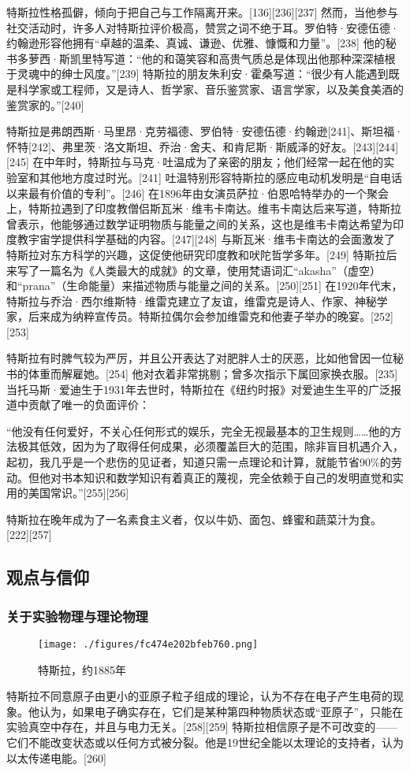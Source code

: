 特斯拉性格孤僻，倾向于把自己与工作隔离开来。[136][236][237] 然而，当他参与社交活动时，许多人对特斯拉评价极高，赞赏之词不绝于耳。罗伯特·安德伍德·约翰逊形容他拥有“卓越的温柔、真诚、谦逊、优雅、慷慨和力量”。[238] 他的秘书多萝西·斯凯里特写道：“他的和蔼笑容和高贵气质总是体现出他那种深深植根于灵魂中的绅士风度。”[239] 特斯拉的朋友朱利安·霍桑写道：“很少有人能遇到既是科学家或工程师，又是诗人、哲学家、音乐鉴赏家、语言学家，以及美食美酒的鉴赏家的。”[240]

特斯拉是弗朗西斯·马里昂·克劳福德、罗伯特·安德伍德·约翰逊[241]、斯坦福·怀特[242]、弗里茨·洛文斯坦、乔治·舍夫、和肯尼斯·斯威泽的好友。[243][244][245] 在中年时，特斯拉与马克·吐温成为了亲密的朋友；他们经常一起在他的实验室和其他地方度过时光。[241] 吐温特别形容特斯拉的感应电动机发明是“自电话以来最有价值的专利”。[246] 在1896年由女演员萨拉·伯恩哈特举办的一个聚会上，特斯拉遇到了印度教僧侣斯瓦米·维韦卡南达。维韦卡南达后来写道，特斯拉曾表示，他能够通过数学证明物质与能量之间的关系，这也是维韦卡南达希望为印度教宇宙学提供科学基础的内容。[247][248] 与斯瓦米·维韦卡南达的会面激发了特斯拉对东方科学的兴趣，这促使他研究印度教和吠陀哲学多年。[249] 特斯拉后来写了一篇名为《人类最大的成就》的文章，使用梵语词汇“akasha”（虚空）和“prana”（生命能量）来描述物质与能量之间的关系。[250][251] 在1920年代末，特斯拉与乔治·西尔维斯特·维雷克建立了友谊，维雷克是诗人、作家、神秘学家，后来成为纳粹宣传员。特斯拉偶尔会参加维雷克和他妻子举办的晚宴。[252][253]

特斯拉有时脾气较为严厉，并且公开表达了对肥胖人士的厌恶，比如他曾因一位秘书的体重而解雇她。[254] 他对衣着非常挑剔；曾多次指示下属回家换衣服。[235] 当托马斯·爱迪生于1931年去世时，特斯拉在《纽约时报》对爱迪生生平的广泛报道中贡献了唯一的负面评价：

“他没有任何爱好，不关心任何形式的娱乐，完全无视最基本的卫生规则……他的方法极其低效，因为为了取得任何成果，必须覆盖巨大的范围，除非盲目机遇介入，起初，我几乎是一个悲伤的见证者，知道只需一点理论和计算，就能节省90\%的劳动。但他对书本知识和数学知识有着真正的蔑视，完全依赖于自己的发明直觉和实用的美国常识。”[255][256]

特斯拉在晚年成为了一名素食主义者，仅以牛奶、面包、蜂蜜和蔬菜汁为食。[222][257]
\subsection{观点与信仰}
\subsubsection{关于实验物理与理论物理}  
\begin{figure}[ht]
\centering
\texttt{[image: ./figures/fc474e202bfeb760.png]}
\caption{特斯拉，约1885年} \label{fig_Tesla_24}
\end{figure}
特斯拉不同意原子由更小的亚原子粒子组成的理论，认为不存在电子产生电荷的现象。他认为，如果电子确实存在，它们是某种第四种物质状态或“亚原子”，只能在实验真空中存在，并且与电力无关。[258][259] 特斯拉相信原子是不可改变的——它们不能改变状态或以任何方式被分裂。他是19世纪全能以太理论的支持者，认为以太传递电能。[260]

